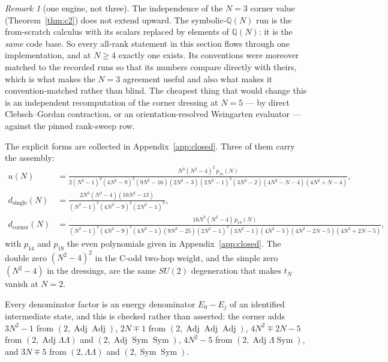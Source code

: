 \documentclass[11pt]{article}
\theoremstyle{definition}
\theoremstyle{remark}
\newtheorem{remark}[theorem]{Remark}
\DeclareMathOperator{\adj}{Adj}
\DeclareMathOperator{\Sym}{Sym}
\newcommand{\Q}{\mathbb{Q}}
\newcommand{\chk}[1]{}
\begin{document}
\begin{remark}[one engine, not three]\label{rem:oneengine}
The independence of the $N=3$ corner value (Theorem~\ref{thm:c2}) does not
extend upward. The symbolic-$\Q(N)$ run is the from-scratch calculus with its
scalars replaced by elements of $\Q(N)$: it is the \emph{same} code base. So
every all-rank statement in this section flows through one implementation, and
at $N\ge4$ exactly one exists. Its conventions were moreover matched to the
recorded runs so that its numbers compare directly with theirs, which is what
makes the $N=3$ agreement useful and also what makes it convention-matched
rather than blind. The cheapest thing that would change this is an independent
recomputation of the corner dressing at $N=5$ --- by direct Clebsch--Gordan
contraction, or an orientation-resolved Weingarten evaluator --- against the
pinned rank-sweep row.
\end{remark}

The explicit forms are collected in Appendix~\ref{app:closed}. Three of them
carry the assembly:
\begin{align}
  u(N)&=\frac{N^3(N^2-4)^2\,p_{14}(N)}
             {2(N^2-1)^3(4N^2-9)^3(9N^2-16)(2N^2-3)(2N^2-1)^3(3N^2-2)(4N^2-N-4)(4N^2+N-4)},
  \label{eq:u}\\[2pt]
  d_{\mathrm{single}}(N)&=\frac{2N^3(N^2-4)(10N^2-13)}{(N^2-1)^3(4N^2-9)^2(2N^2-1)^2},
  \label{eq:dsingle}\\[2pt]
  d_{\mathrm{corner}}(N)&=\frac{16N^3(N^2-4)\,p_{18}(N)}
      {(N^2-1)^3(4N^2-9)^3(4N^2-1)(9N^2-25)(2N^2-1)^3(3N^2-1)(4N^2-5)(4N^2-2N-5)(4N^2+2N-5)},
  \label{eq:dcorner}
\end{align}
with $p_{14}$ and $p_{18}$ the even polynomials given in
Appendix~\ref{app:closed}. The double zero $(N^2-4)^2$ in the C-odd two-hop
weight, and the simple zero $(N^2-4)$ in the dressings, are the same $SU(2)$
degeneration that makes $t_N$ vanish at $N=2$.

Every denominator factor is an energy denominator $E_0-E_j$ of an identified
intermediate state, and this is checked rather than asserted: the corner adds
$3N^2-1$ from $(2,\adj\adj)$, $2N\mp1$ from $(2,\adj\adj\adj)$,
$4N^2\mp2N-5$ from $(2,\adj\Lambda\Lambda)$ and $(2,\adj\Sym\Sym)$, $4N^2-5$
from $(2,\adj\Lambda\Sym)$, and $3N\mp5$ from $(2,\Lambda\Lambda)$ and
$(2,\Sym\Sym)$.\chk{the corner dressing by channel: 87 C-odd channels, at most three doubled links in any direct-term state, every resolvent factor the corner adds to R20 the energy of an identified intermediate state, and the Weingarten poles at N = -+3 of single channels cancelling in the sum}
\end{document}
